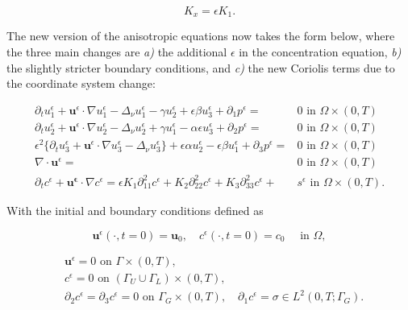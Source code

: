 \documentclass[11pt]{article}
\begin{document}
\begin{equation} \label{ksepsk1} K_x = \epsilon K_1. \end{equation}

The new version of the anisotropic equations now takes the form below, where the three main changes are \textit{a)} the additional $\epsilon$ in the concentration equation, \textit{b)} the slightly stricter boundary conditions, and \textit{c)} the new Coriolis terms due to the coordinate system change:

\begin{equation} \label{ANSC1-5}
  \begin{split}
    \partial_t u^\epsilon _1 + \mathbf{u}^\epsilon \cdot \nabla u^\epsilon _1 -\Delta_\nu u^\epsilon _1 -\gamma u_2^\epsilon + \epsilon \beta u_3^\epsilon + \partial_1 p^\epsilon = & 0 \text{ in } \Omega \times (0,T) \\
    \partial_t u_2^\epsilon + \mathbf{u}^\epsilon \cdot \nabla u_2^\epsilon -\Delta_\nu u_2^\epsilon + \gamma u_1^\epsilon - \alpha \epsilon u^\epsilon_3  + \partial_2 p^\epsilon = & 0 \text{ in } \Omega \times (0,T) \\
    \epsilon^2 \{  \partial_t u_3^\epsilon + \mathbf{u}^\epsilon \cdot \nabla u_3^\epsilon -\Delta_\nu u_3^{\epsilon} \} + \epsilon \alpha u^\epsilon_2 - \epsilon \beta u_1^\epsilon + \partial_3 p^\epsilon = & 0 \text{ in } \Omega \times (0,T) \\
    \nabla \cdot \mathbf{u}^\epsilon = & 0 \text{ in } \Omega \times (0,T) \\
    \partial_t c^\epsilon + \mathbf{u^\epsilon} \cdot \nabla c^\epsilon = \epsilon K_1 \partial_{11} ^ 2 c^\epsilon + K_2 \partial_{22} ^ 2 c^\epsilon + K_3 \partial_{33} ^ 2 c^\epsilon + & s^\epsilon \text{ in } \Omega \times (0,T).
  \end{split}
\end{equation}
  
With the initial and boundary conditions defined as
    
\begin{equation} \label{ANSC7}
  \mathbf{u}^\epsilon (\cdot, t = 0) = \mathbf{u}_0, \quad c^\epsilon (\cdot, t=0) = c_0  \quad \text{ in } \Omega,
\end{equation}
  
\begin{equation} \label{ANSC8}
  \begin{split}
    & \mathbf{u}^\epsilon = 0 \text{ on } \Gamma \times (0,T), \\
    &c^\epsilon = 0 \text{ on } ( \Gamma_U \cup \Gamma_L) \times (0,T), \\
    & \partial_2 c^\epsilon = \partial_3 c^\epsilon = 0 \text{ on } \Gamma_G \times (0,T), \quad \partial_1 c^\epsilon = \sigma \in L^2 (0,T; \Gamma_G). \\
  \end{split}
\end{equation}
    
\end{document}
